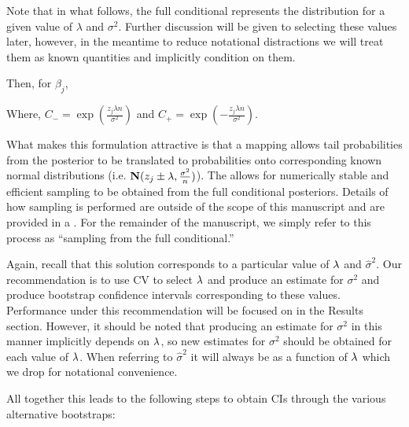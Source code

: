Note that in what follows, the full conditional represents the distribution for a given value of $\lambda$ and $\sigma^2$. Further discussion will be given to selecting these values later, however, in the meantime to reduce notational distractions we will treat them as known quantities and implicitly condition on them.

Then, for $\beta_j$,


Where, $C_{-} = \exp(\frac{z_j \lambda n}{\sigma^2})$ and $C_{+} = \exp(-\frac{z_j \lambda n}{\sigma^2})$.

What makes this formulation attractive is that a mapping allows tail probabilities from the posterior to be translated to probabilities onto corresponding known normal distributions (i.e. $\mathbf{N}(z_j \pm \lambda, \frac{\sigma^2}{n})$). The allows for numerically stable and efficient sampling to be obtained from the full conditional posteriors. Details of how sampling is performed are outside of the scope of this manuscript and are provided in a . For the remainder of the manuscript, we simply refer to this process as ``sampling from the full conditional.''

Again, recall that this solution corresponds to a particular value of $\lambda$ and $\hat{\sigma}^2$. Our recommendation is to use CV to select $\lambda$ and produce an estimate for $\sigma^2$ and produce bootstrap confidence intervals corresponding to these values. Performance under this recommendation will be focused on in the Results section. However, it should be noted that producing an estimate for $\sigma^2$ in this manner implicitly depends on $\lambda$, so new estimates for $\sigma^2$ should be obtained for each value of $\lambda$. When referring to $\hat{\sigma}^2$ it will always be as a function of $\lambda$ which we drop for notational convenience.

All together this leads to the following steps to obtain CIs through the various alternative bootstraps:

